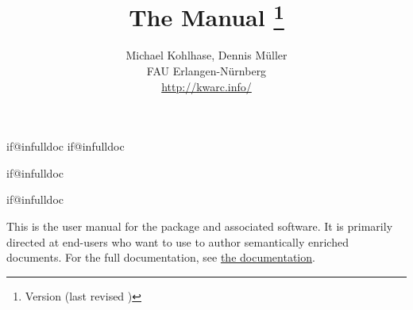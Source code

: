 \makeatletter
\ifcsname if@infulldoc\endcsname\else
    \expandafter\newif\csname if@infulldoc\endcsname\@infulldocfalse
\fi
\makeatother

\csname if@infulldoc\endcsname\else

\def\bibfolder#1{../lib/bib/#1}



\infulldoctrue


  \csname if@infulldoc\endcsname\else
	\title{
		The {} Manual
		\thanks{Version {\fileversion} (last revised {\filedate})}
 	}
	\author{Michael Kohlhase, Dennis Müller\\
		FAU Erlangen-Nürnberg\\
		\url{http://kwarc.info/}
	}
	\maketitle
	
	\bigskip

  This is the user manual for the \sTeX package and 
  associated software. It is primarily directed at end-users 
  who want to use \sTeX to author semantically
  enriched documents. For the full documentation, see
  \href{\basedocurl/stex.pdf}{the \sTeX documentation}.
	
